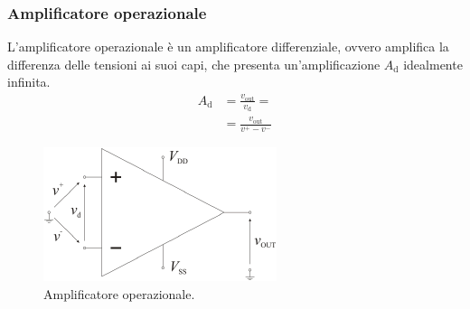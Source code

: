 \documentclass[a4paper]{article}
\begin{document}
			\subsubsection{Amplificatore operazionale}
				L'amplificatore operazionale è un amplificatore differenziale, ovvero amplifica la differenza delle tensioni ai suoi capi, che presenta un'amplificazione $ A_{\mathrm{d}} $ idealmente infinita.
				\begin{equation*}
					\begin{split}
						A_{\mathrm{d}} &= \frac{v_{\mathrm{out}}}{v_{\mathrm{d}}} = \\
									   &= \frac{v_{\mathrm{out}}}{v^{+} - v^{-}}
					\end{split}
				\end{equation*}
				\begin{figure}[h!]
					\centering
					\includegraphics[scale=0.7]{amplificatoreOperazionale}
					\caption{Amplificatore operazionale.}
					\label{fig:amplificatoreOperazionale}
				\end{figure}
\end{document}
